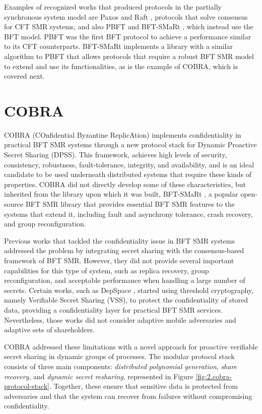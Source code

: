 Examples of recognized works that produced protocols in the partially synchronous system model are Paxos \cite{paxos} and Raft \cite{raft}, protocols that solve consensus for CFT SMR systems, and also PBFT \cite{pbft} and BFT-SMaRt \cite{bftsmart}, which instead use the BFT model. PBFT was the first BFT protocol to achieve a performance similar to its CFT counterparts. BFT-SMaRt implements a library with a similar algorithm to PBFT that allows protocols that require a robust BFT SMR model to extend and use its functionalities, as is the example of COBRA, which is covered next.



\section{COBRA} \label{sec:cobra}

COBRA (COnfidential Byzantine ReplicAtion) \cite{cobra} implements confidentiality in practical BFT SMR systems through a new protocol stack for Dynamic Proactive Secret Sharing (DPSS). This framework, achieves high levels of security, consistency, robustness, fault-tolerance, integrity, and availability, and is an ideal candidate to be used underneath distributed systems that require these kinds of properties. COBRA did not directly develop some of these characteristics, but inherited from the library upon which it was built, BFT-SMaRt \cite{bftsmart}, a popular open-source BFT SMR library that provides essential BFT SMR features to the systems that extend it, including fault and asynchrony tolerance, crash recovery, and group reconfiguration.

Previous works that tackled the confidentiality issue in BFT SMR systems addressed the problem by integrating secret sharing with the consensus-based framework of BFT SMR. However, they did not provide several important capabilities for this type of system, such as replica recovery, group reconfiguration, and acceptable performance when handling a large number of secrets. Certain works, such as DepSpace \cite{depspace}, started using threshold cryptography, namely Verifiable Secret Sharing (VSS), to protect the confidentiality of stored data, providing a confidentiality layer for practical BFT SMR services. Nevertheless, those works did not consider adaptive mobile adversaries and adaptive sets of shareholders.

COBRA addressed these limitations with a novel approach for proactive verifiable secret sharing in dynamic groups of processes. The modular protocol stack consists of three main components: \textit{distributed polynomial generation}, \textit{share recovery}, and \textit{dynamic secret resharing}, represented in Figure \ref{fig:2.cobra-protocol-stack}. Together, these ensure that sensitive data is protected from adversaries and that the system can recover from failures without compromising confidentiality.

